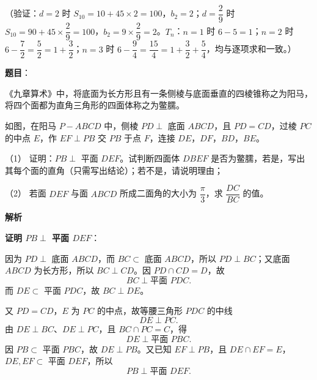 \begin{answer}
（验证：\(d=2\) 时 \(S_{10}=10+45\times2=100\)，\(b_2=2\)；\(d=\dfrac29\) 时 \(S_{10}=90+45\times\dfrac29=100\)，\(b_2=9\times\dfrac29=2\)。\(T_n\)：\(n=1\) 时 \(6-5=1\)；\(n=2\) 时 \(6-\dfrac72=\dfrac52=1+\dfrac32\)；\(n=3\) 时 \(6-\dfrac94=\dfrac{15}{4}=1+\dfrac32+\dfrac54\)，均与逐项求和一致。）



\end{answer}
\begin{answer}

\textbf{题目}：

《九章算术》中，将底面为长方形且有一条侧棱与底面垂直的四棱锥称之为阳马，将四个面都为直角三角形的四面体称之为鳖臑。

如图，在阳马 \(P-ABCD\) 中，侧棱 \(PD\perp\) 底面 \(ABCD\)，且 \(PD=CD\)，过棱 \(PC\) 的中点 \(E\)，作 \(EF\perp PB\) 交 \(PB\) 于点 \(F\)，连接 \(DE\)，\(DF\)，\(BD\)，\(BE\)。

（1） 证明：\(PB\perp\) 平面 \(DEF\)。试判断四面体 \(DBEF\) 是否为鳖臑，若是，写出其每个面的直角（只需写出结论）；若不是，请说明理由；

（2） 若面 \(DEF\) 与面 \(ABCD\) 所成二面角的大小为 \(\dfrac{\pi}{3}\)，求 \(\dfrac{DC}{BC}\) 的值。
\nopagebreak[4]
\begin{center}\end{center}
\nopagebreak[4]
\textbf{解析}


\textbf{证明 \(PB\perp\) 平面 \(DEF\)}：

因为 \(PD\perp\) 底面 \(ABCD\)，而 \(BC\subset\) 底面 \(ABCD\)，所以 \(PD\perp BC\)；又底面 \(ABCD\) 为长方形，所以 \(BC\perp CD\)。因 \(PD\cap CD=D\)，故
\nopagebreak[4]
\[
BC\perp\text{平面 }PDC.
\]
而 \(DE\subset\) 平面 \(PDC\)，故 \(BC\perp DE\)。

又 \(PD=CD\)，\(E\) 为 \(PC\) 的中点，故等腰三角形 \(PDC\) 的中线
\nopagebreak[4]
\[
DE\perp PC.
\]
由 \(DE\perp BC\)、\(DE\perp PC\)，且 \(BC\cap PC=C\)，得
\nopagebreak[4]
\[
DE\perp\text{平面 }PBC.
\]
因 \(PB\subset\) 平面 \(PBC\)，故 \(DE\perp PB\)。又已知 \(EF\perp PB\)，且 \(DE\cap EF=E\)，\(DE,EF\subset\) 平面 \(DEF\)，所以
\nopagebreak[4]
\[
PB\perp\text{平面 }DEF.
\]


\end{answer}
